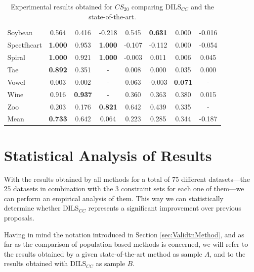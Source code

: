 \documentclass[review]{elsarticle}
\begin{document}
\begin{table}[!h]
{\begin{tabular}{lccccccc}
			Soybean & 0.564 & 0.416 & -0.218 & 0.545 & \textbf{0.631} & 0.000 & -0.016 \\
			Spectfheart & \textbf{1.000} & 0.953 & \textbf{1.000} & -0.107 & -0.112 & 0.000 & -0.054 \\
			Spiral & \textbf{1.000} & 0.921 & \textbf{1.000} & -0.003 & 0.011 & 0.006 & 0.045 \\
			Tae & \textbf{0.892} & 0.351 & - & 0.008 & 0.000 & 0.035 & 0.000 \\
			Vowel & 0.003 & 0.002 & - & 0.063 & -0.003 & \textbf{0.071} & - \\
			Wine & 0.916 & \textbf{0.937} & - & 0.360 & 0.363 & 0.380 & 0.015 \\
			Zoo & 0.203 & 0.176 & \textbf{0.821} & 0.642 & 0.439 & 0.335 & - \\
			\hline
			Mean & \textbf{0.733} & 0.642 & 0.064 & 0.223 & 0.285 & 0.344 & -0.187 \\
			\hline
			
		\end{tabular}}
		
		\caption{Experimental results obtained for $CS_{20}$ comparing DILS$_{CC}$ and the state-of-the-art.}
		\label{tab:results20}
	\end{table}
	
	
\clearpage

\section{Statistical Analysis of Results} \label{sec:analisis}

With the results obtained by all methods for a total of 75 different datasets---the 25 datasets in combination with the 3 constraint sets for each one of them---we can perform an empirical analysis of them. This way we can statistically determine whether DILS$_{CC}$ represents a significant improvement over previous proposals.

Having in mind the notation introduced in Section \ref{sec:ValidtnMethod}, and as far as the comparison of population-based methods is concerned, we will refer to the results obtained by a given state-of-the-art method as sample $A$, and to the results obtained with DILS$_{CC}$ as sample $B$.
\end{document}
